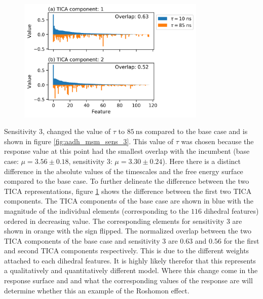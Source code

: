 \begin{figure}
    \centering
    \includegraphics[width=0.8\textwidth]{chapters/msm_optimization/figures/aadh_msm_sens_3_tica.png}
    \label{fig:aadh_msm_sens_3_tica}
\end{figure}

Sensitivity 3, changed the value of $\tau$ to $\SI{85}{\nano\second}$ compared to the base case and is shown in figure \ref{fig:aadh_msm_sens_3}.   This value of $\tau$ was chosen because the response value at this point had the smallest  overlap with the incumbent (base case: $\mu=3.56 \pm 0.18$, sensitivity 3: $\mu=3.30 \pm 0.24$).  Here there is a distinct difference in the absolute values of the timescales and the free energy surface compared to the base case. To further delineate the difference between the two TICA representations, figure \ref{fig:aadh_msm_sens_3_tica} shows the difference between the first two TICA components. The  TICA components of the base case are shown in blue with the magnitude of the individual elements (corresponding to the $116$ dihedral features) ordered in decreasing value. The corresponding elements for sensitivity 3 are shown in orange with the sign flipped. The normalized overlap between the two TICA components of the base case and sensitivity 3 are $0.63$ and $0.56$  for the first and second TICA components respectively. This is due to the different weights attached to each dihedral features. It is highly likely therefor that this represents a qualitatively and quantitatively different model. Where this change come in the response surface and and what the corresponding values of the response are will determine whether this an example of the Roshomon effect. 


